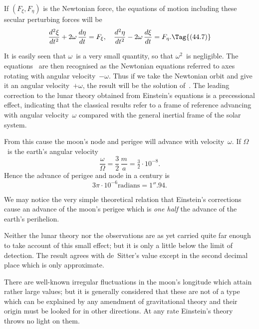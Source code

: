 \documentclass[12pt]{book}
\begin{document}
If $(F_{\xi}, F_{\eta})$ is the Newtonian force, the equations of motion including these
secular perturbing forces will be
\[
\frac{d^{2}\xi}{dt^{2}} + 2\omega\, \frac{d\eta}{dt} = F_{\xi},\quad
\frac{d^{2}\eta}{dt^{2}} - 2\omega\, \frac{d\xi}{dt} = F_{\eta}.
\Tag{(44.7)}
\]

It is easily seen that $\omega$~is a very small quantity, so that $\omega^2$~is negligible.
The equations~ are then recognised as the Newtonian equations referred
to axes rotating with angular velocity~$-\omega$. Thus if we take the Newtonian
orbit and give it an angular velocity~$+\omega$, the result will be the solution of~.
The leading correction to the lunar theory obtained from Einstein's
equations is a precessional effect, indicating that the classical results refer to
a frame of reference advancing with angular velocity~$\omega$ compared with the
general inertial frame of the solar system.

From this cause the moon's node and perigee will advance with velocity~$\omega$.
If $\Omega$~is the earth's angular velocity
\[
\frac{\omega}{\Omega} = \frac{3}{2}\, \frac{m}{a} = \tfrac{3}{2} \cdot 10^{-8}.
\]
Hence the advance of perigee and node in a century is
\[
3\pi \cdot 10^{-6} \text{radians} = 1''.94.
\]

We may notice the very simple theoretical relation that Einstein's corrections
cause an advance of the moon's perigee which is \emph{one half} the advance
of the earth's perihelion.

Neither the lunar theory nor the observations are as yet carried quite far
enough to take account of this small effect; but it is only a little below the
limit of detection. The result agrees with de~Sitter's value except in the second
decimal place which is only approximate.

There are well-known irregular fluctuations in the moon's longitude which
attain rather large values; but it is generally considered that these are not
of a type which can be explained by any amendment of gravitational theory
and their origin must be looked for in other directions. At any rate Einstein's
theory throws no light on them.
\end{document}
